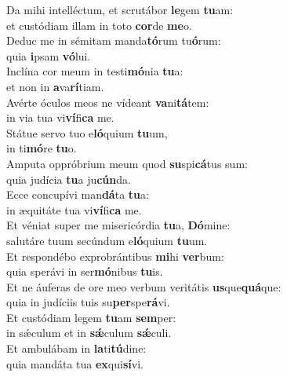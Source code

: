 \evenverse Da mihi intelléctum, et scrutábor \textbf{le}gem \textbf{tu}am:~\*\\
\evenverse et custódiam illam in toto \textbf{cor}de \textbf{me}o.\\
\oddverse Deduc me in sémitam manda\textbf{tó}rum tu\textbf{ó}rum:~\*\\
\oddverse quia \textbf{i}psam \textbf{vó}lui.\\
\evenverse Inclína cor meum in testi\textbf{mó}nia \textbf{tu}a:~\*\\
\evenverse et non in \textbf{a}va\textbf{rí}tiam.\\
\oddverse Avérte óculos meos ne vídeant \textbf{va}ni\textbf{tá}tem:~\*\\
\oddverse in via tua vi\textbf{ví}fi\textbf{ca} me.\\
\evenverse Státue servo tuo e\textbf{ló}quium \textbf{tu}um,~\*\\
\evenverse in ti\textbf{mó}re \textbf{tu}o.\\
\oddverse Amputa oppróbrium meum quod \textbf{su}spi\textbf{cá}tus sum:~\*\\
\oddverse quia judícia \textbf{tu}a ju\textbf{cún}da.\\
\evenverse Ecce concupívi man\textbf{dá}ta \textbf{tu}a:~\*\\
\evenverse in æquitáte tua vi\textbf{ví}fi\textbf{ca} me.\\
\oddverse Et véniat super me misericórdia \textbf{tu}a, \textbf{Dó}mine:~\*\\
\oddverse salutáre tuum secúndum e\textbf{ló}quium \textbf{tu}um.\\
\evenverse Et respondébo exprobrántibus \textbf{mi}hi \textbf{ver}bum:~\*\\
\evenverse quia sperávi in ser\textbf{mó}nibus \textbf{tu}is.\\
\oddverse Et ne áuferas de ore meo verbum veritátis \textbf{us}que\textbf{quá}que:~\*\\
\oddverse quia in judíciis tuis su\textbf{per}spe\textbf{rá}vi.\\
\evenverse Et custódiam legem \textbf{tu}am \textbf{sem}per:~\*\\
\evenverse in sǽculum et in \textbf{sǽ}culum \textbf{sǽ}culi.\\
\oddverse Et ambulábam in \textbf{la}ti\textbf{tú}dine:~\*\\
\oddverse quia mandáta tua \textbf{ex}qui\textbf{sí}vi.\\
